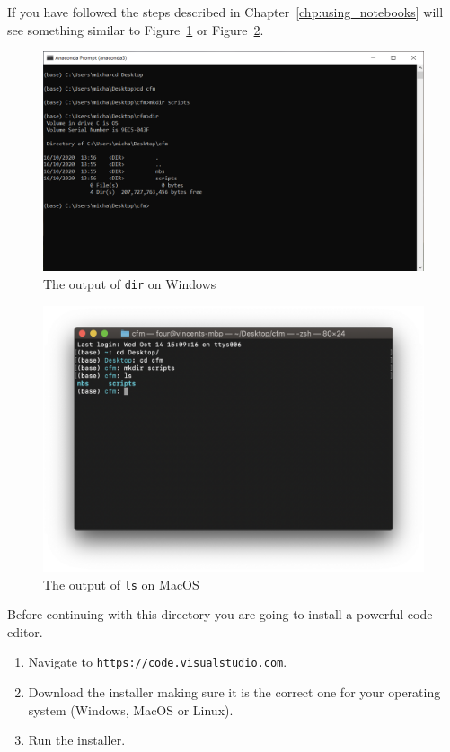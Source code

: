 




If you have followed the steps described in Chapter~\ref{chp:using_notebooks}
will see something similar to Figure~\ref{fig:contents_of_directory_on_windows}
or Figure~\ref{fig:contents_of_directory_on_MacOS}.

\begin{figure}[htbp]
\centering
\noindent\includegraphics[width=0.750\linewidth]{./assets/output_of_dir/main.png}
\caption{The output of \texttt{dir} on Windows}
\label{fig:contents_of_directory_on_windows}
\end{figure}


\begin{figure}[htbp]
\centering
\noindent\includegraphics[width=0.750\linewidth]{./assets/output_of_ls/main.png}
\caption{The output of \texttt{ls} on MacOS}
\label{fig:contents_of_directory_on_MacOS}
\end{figure}


Before continuing with this directory you are going to install a
powerful code editor.
\begin{enumerate}

\item 

Navigate to \texttt{https://code.visualstudio.com}.

\item 

Download the installer making sure it is the correct one for your operating
system (Windows, MacOS or Linux).

\item 

Run the installer.

\end{enumerate}


